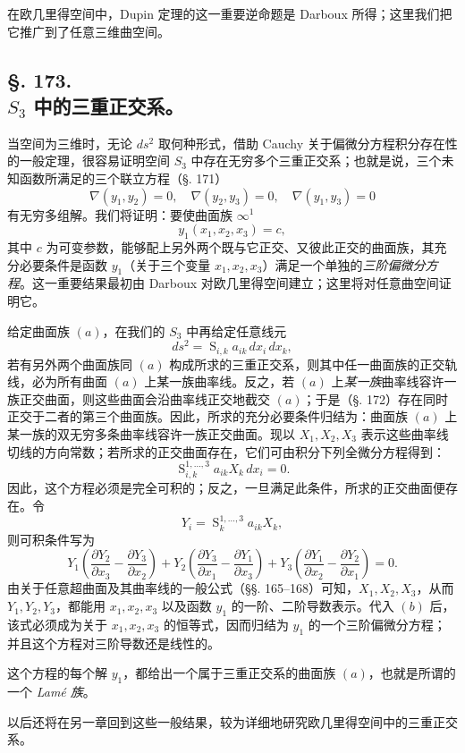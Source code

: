 在欧几里得空间中，Dupin 定理的这一重要逆命题是 Darboux 所得；这里我们把它推广到了任意三维曲空间。

\subsection*{§. 173.\\ \(S_3\) 中的三重正交系。}

当空间为三维时，无论 \(ds^2\) 取何种形式，借助 Cauchy 关于偏微分方程积分存在性的一般定理，很容易证明空间 \(S_3\) 中存在无穷多个三重正交系；也就是说，三个未知函数所满足的三个联立方程（\S. 171）
\[
 \nabla(y_1,y_2)=0,\quad \nabla(y_2,y_3)=0,\quad \nabla(y_1,y_3)=0
\]
有无穷多组解。我们将证明：要使曲面族 \(\infty^1\)
\[
\tag{$a$}
 y_1(x_1,x_2,x_3)=c,
\]
其中 \(c\) 为可变参数，能够配上另外两个既与它正交、又彼此正交的曲面族，其充分必要条件是函数 \(y_1\)（关于三个变量 \(x_1,x_2,x_3\)）满足一个单独的\emph{三阶偏微分方程}。这一重要结果最初由 Darboux 对欧几里得空间建立；这里将对任意曲空间证明它。

给定曲面族 \((a)\)，在我们的 \(S_3\) 中再给定任意线元
\[
 ds^2=\mathop{\mathrm{S}}_{i,k}a_{ik}\,dx_i\,dx_k,
\]
若有另外两个曲面族同 \((a)\) 构成所求的三重正交系，则其中任一曲面族的正交轨线，必为所有曲面 \((a)\) 上某一族曲率线。反之，若 \((a)\) 上\emph{某一族}曲率线容许一族正交曲面，则这些曲面会沿曲率线正交地截交 \((a)\)；于是（\S. 172）存在同时正交于二者的第三个曲面族。因此，所求的充分必要条件归结为：曲面族 \((a)\) 上某一族的双无穷多条曲率线容许一族正交曲面。现以 \(X_1,X_2,X_3\) 表示这些曲率线切线的方向常数；若所求的正交曲面存在，它们可由积分下列全微分方程得到：
\[
 \mathop{\mathrm{S}}_{i,k}^{1,\ldots,3}a_{ik}X_k\,dx_i=0.
\]
因此，这个方程必须是完全可积的；反之，一旦满足此条件，所求的正交曲面便存在。令
\[
 Y_i=\mathop{\mathrm{S}}_k^{1,\ldots,3}a_{ik}X_k,
\]
则可积条件写为
\[
\tag{$b$}
Y_1\left(\frac{\partial Y_2}{\partial x_3}-\frac{\partial Y_3}{\partial x_2}\right)
+Y_2\left(\frac{\partial Y_3}{\partial x_1}-\frac{\partial Y_1}{\partial x_3}\right)
+Y_3\left(\frac{\partial Y_1}{\partial x_2}-\frac{\partial Y_2}{\partial x_1}\right)=0.
\]
由关于任意超曲面及其曲率线的一般公式（\S\S. 165--168）可知，\(X_1,X_2,X_3\)，从而 \(Y_1,Y_2,Y_3\)，都能用 \(x_1,x_2,x_3\) 以及函数 \(y_1\) 的一阶、二阶导数表示。代入 \((b)\) 后，该式必须成为关于 \(x_1,x_2,x_3\) 的恒等式，因而归结为 \(y_1\) 的一个三阶偏微分方程；并且这个方程对三阶导数还是线性的。

这个方程的每个解 \(y_1\)，都给出一个属于三重正交系的曲面族 \((a)\)，也就是所谓的一个 \emph{Lamé 族}。

以后还将在另一章回到这些一般结果，较为详细地研究欧几里得空间中的三重正交系。

\begin{center}
\end{center}
